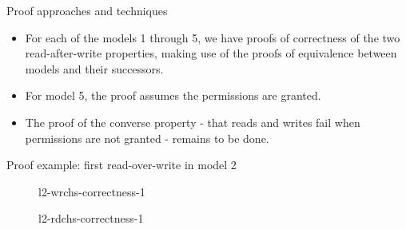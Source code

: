 \documentclass{beamer}
\begin{document}
\begin{frame}{Proof approaches and techniques}
  \begin{itemize}
  \item For each of the models 1 through 5, we have proofs of correctness of
    the two read-after-write properties, making use of the proofs of
    equivalence between models and their successors.
  \item For model 5, the proof assumes the permissions are
    granted.
  \item The proof of the converse property - that reads and writes
    fail when permissions are not granted - remains to be done.
  \end{itemize}
\end{frame}

\begin{frame}{Proof example: first read-over-write in model 2}
  \begin{figure}
    \caption{l2-wrchs-correctness-1}
  \end{figure}
  \begin{figure}
    \caption{l2-rdchs-correctness-1}
  \end{figure}
\end{frame}
\end{document}
